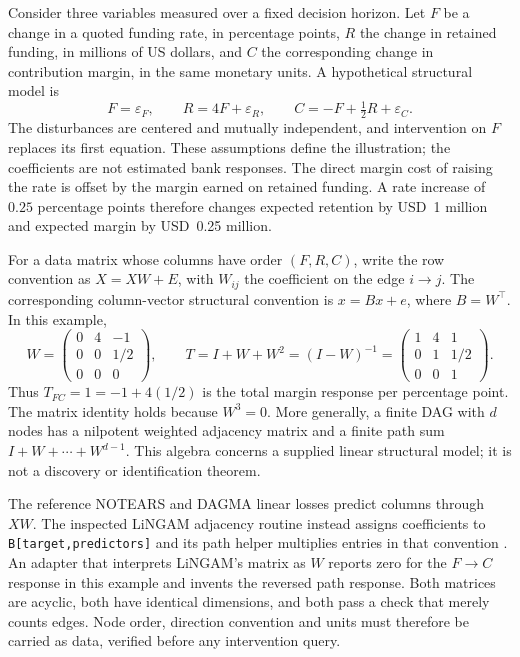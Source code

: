 Consider three variables measured over a fixed decision horizon. Let \(F\) be a
change in a quoted funding rate, in percentage points, \(R\) the change in
retained funding, in millions of US dollars, and \(C\) the corresponding change
in contribution margin, in the same monetary units. A hypothetical structural
model is
\begin{equation}
 F=\varepsilon_F,\qquad R=4F+\varepsilon_R,\qquad
 C=-F+\tfrac12R+\varepsilon_C.
 \label{exec13:pydisc-funding}
\end{equation}
The disturbances are centered and mutually independent, and intervention on
\(F\) replaces its first equation. These assumptions define the illustration;
the coefficients are not estimated bank responses. The direct margin cost of
raising the rate is offset by the margin earned on retained funding. A rate
increase of \(0.25\) percentage points therefore changes expected retention by
USD~1 million and expected margin by USD~0.25 million.

For a data matrix whose columns have order \((F,R,C)\), write the row convention
as \(X=XW+E\), with \(W_{ij}\) the coefficient on the edge \(i\to j\). The
corresponding column-vector structural convention is \(x=Bx+e\), where
\(B=W^\top\). In this example,
\begin{equation}
 W=\begin{pmatrix}0&4&-1\\0&0&1/2\\0&0&0\end{pmatrix},\qquad
 T=I+W+W^2=(I-W)^{-1}
  =\begin{pmatrix}1&4&1\\0&1&1/2\\0&0&1\end{pmatrix}.
\end{equation}
Thus \(T_{FC}=1=-1+4(1/2)\) is the total margin response per percentage point.
The matrix identity holds because \(W^3=0\). More generally, a finite DAG with
\(d\) nodes has a nilpotent weighted adjacency matrix and a finite path sum
\(I+W+\cdots+W^{d-1}\). This algebra concerns a supplied linear structural
model; it is not a discovery or identification theorem.

The reference NOTEARS and DAGMA linear losses predict columns through \(XW\).
The inspected LiNGAM adjacency routine instead assigns coefficients to
\texttt{B[target,predictors]} and its path helper multiplies entries in that
convention \citep{exec13_pydisc_notears,exec13_pydisc_dagma,exec13_pydisc_lingam}.
An adapter that interprets LiNGAM's matrix as \(W\) reports zero for the
\(F\to C\) response in this example and invents the reversed path response.
Both matrices are acyclic, both have identical dimensions, and both pass a
check that merely counts edges. Node order, direction convention and units
must therefore be carried as data, verified before any intervention query.

